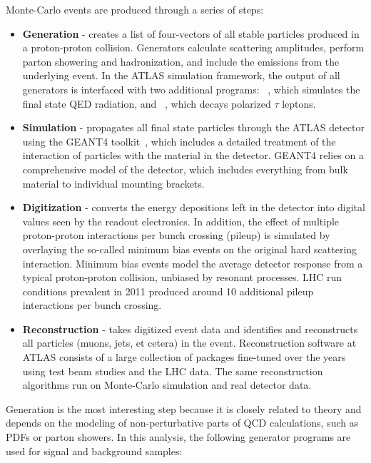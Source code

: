 Monte-Carlo events are produced through a series of steps:
\begin{itemize}
\item \textbf{Generation} - creates a list of four-vectors of all stable particles produced in a proton-proton collision. Generators calculate scattering amplitudes, perform parton showering and hadronization, and include the emissions from the underlying event. In the ATLAS simulation framework, the output of all generators is interfaced with two additional programs: \Photos~\cite{Golonka:2005pn}, which simulates the final state QED radiation, and \Tauola~\cite{Jadach:1990mz}, which decays polarized $\tau$ leptons.
\item \textbf{Simulation} - propagates all final state particles through the ATLAS detector using the GEANT4 toolkit~\cite{geant4}, which includes a detailed treatment of the interaction of particles with the material in the detector. GEANT4 relies on a comprehensive model of the detector, which includes everything from bulk material to individual mounting brackets.
\item \textbf{Digitization} - converts the energy depositions left in the detector into digital values seen by the readout electronics. In addition, the effect of multiple proton-proton interactions per bunch crossing (pileup) is simulated by overlaying the so-called minimum bias events on the original hard scattering interaction. Minimum bias events model the average detector response from a typical proton-proton collision, unbiased by resonant processes. LHC run conditions prevalent in 2011 produced around 10 additional pileup interactions per bunch crossing.
\item \textbf{Reconstruction} - takes digitized event data and identifies and reconstructs all particles (muons, jets, et cetera) in the event. Reconstruction software at ATLAS consists of a large collection of packages fine-tuned over the years using test beam studies and the LHC data. The same reconstruction algorithms run on Monte-Carlo simulation and real detector data.
\end{itemize}

Generation is the most interesting step because it is closely related to theory and depends on the modeling of non-perturbative parts of QCD calculations, such as PDFs or parton showers. In this analysis, the following generator programs are used for signal and background samples:

